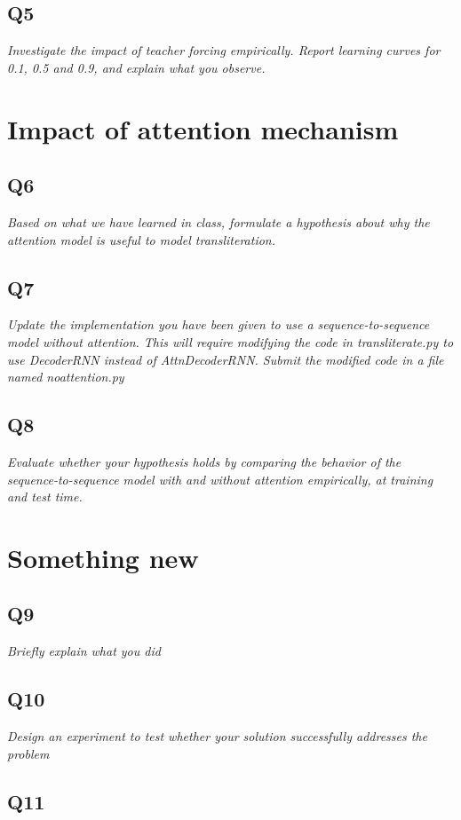 \documentclass[12pt]{article}
\begin{document}
\subsection{Q5}
\textit{
Investigate the impact of teacher forcing empirically. Report learning curves for 0.1, 0.5 and 0.9, and explain what you observe.
}


\section{Impact of attention mechanism}

\subsection{Q6}
\textit{
Based on what we have learned in class, formulate a hypothesis about why the attention model is useful to model transliteration.	
}

\subsection{Q7}
\textit{
Update the implementation you have been given to use a sequence-to-sequence model without attention.  This will require modifying the code in transliterate.py to use DecoderRNN instead of AttnDecoderRNN.  Submit the modified code in a file named noattention.py
}

\subsection{Q8}
\textit{
Evaluate whether your hypothesis holds by comparing the behavior of the sequence-to-sequence model with and without attention empirically, at training and test time.
}

\section{Something new}

\subsection{Q9}
\textit{Briefly explain what you did}

\subsection{Q10}
\textit{Design an experiment to test whether your solution successfully addresses the problem}

\subsection{Q11}
\textit{}
\end{document}
